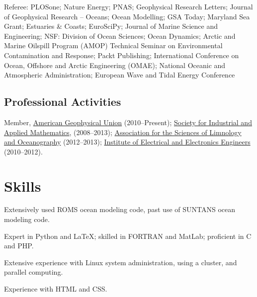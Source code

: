 \documentclass[10pt,letterpaper]{article}
\renewenvironment{itemize}{
  \begin{list}{}{
    \setlength{\leftmargin}{1.5em}
    \setlength{\itemsep}{0.25em}
    \setlength{\parskip}{0pt}
    \setlength{\parsep}{0.25em}
  }
}{
  \end{list}
}
\begin{document}
\begin{itemize}
  \item Referee: PLOSone; Nature Energy; PNAS; Geophysical Research Letters; Journal of Geophysical Research -- Oceans; Ocean Modelling; GSA Today; Maryland Sea Grant; Estuaries \& Coasts; EuroSciPy; Journal of Marine Science and Engineering; NSF: Division of Ocean Sciences; Ocean Dynamics; Arctic and Marine Oilspill Program (AMOP) Technical Seminar on Environmental Contamination and Response; Packt Publishing; International Conference on Ocean, Offshore and Arctic Engineering (OMAE); National Oceanic and Atmospheric Administration; European Wave and Tidal Energy Conference
\end{itemize}


\subsection*{Professional Activities}

\begin{itemize}

\item Member, \href{http://www.agu.org/}{American Geophysical Union} (2010--Present); \href{http://www.siam.org/}{Society for Industrial and Applied Mathematics}, (2008--2013); \href{http://www.aslo.org/}{Association for the Sciences of Limnology and Oceanography} (2012--2013); \href{http://www.ieee.org/}{Institute of Electrical and Electronics Engineers} (2010--2012).

%

\end{itemize}

\section*{Skills}
\begin{itemize}
	\item Extensively used ROMS ocean modeling code, past use of SUNTANS ocean modeling code.
	\item Expert in Python and \LaTeX; skilled in FORTRAN and MatLab; proficient in C and PHP.
	\item Extensive experience with Linux system administration, using a cluster, and parallel computing.
	\item Experience with HTML and CSS.
\end{itemize}
\end{document}
